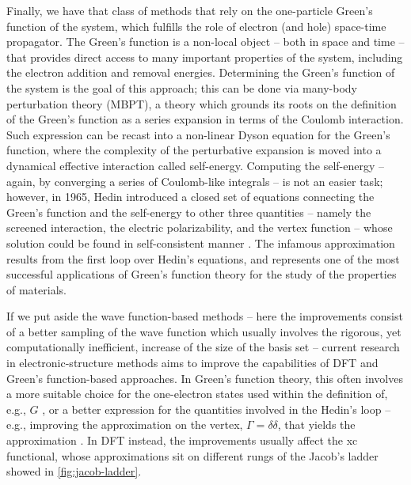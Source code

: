 Finally, we have that class of methods that rely on the one-particle Green's function of the system, which fulfills the role of electron (and hole) space-time propagator. The Green's function is a non-local object -- both in space and time -- that provides direct access to many important properties of the system, including the electron addition and removal energies. Determining the Green's function of the system is the goal of this approach; this can be done via many-body perturbation theory (MBPT), a theory which grounds its roots on the definition of the Green's function as a series expansion in terms of the Coulomb interaction. Such expression can be recast into a non-linear Dyson equation for the Green's function, where the complexity of the perturbative expansion is moved into a dynamical effective interaction called self-energy. Computing the self-energy -- again, by converging a series of Coulomb-like integrals -- is not an easier task; however, in 1965, Hedin introduced a closed set of equations connecting the Green's function and the self-energy to other three quantities -- namely the screened interaction, the electric polarizability, and the vertex function -- whose solution could be found in self-consistent manner \cite{hedin_new_1965}. The infamous \gw approximation results from the first loop over Hedin's equations, and represents one of the most successful applications of Green's function theory for the study of the properties of materials.

If we put aside the wave function-based methods -- here the improvements consist of a better sampling of the wave function which usually involves the rigorous, yet computationally inefficient, increase of the size of the basis set -- current research in electronic-structure methods aims to improve the capabilities of DFT and Green's function-based approaches. In Green's function theory, this often involves a more suitable choice for the one-electron states used within the definition of, e.g., $G$ \cite{bruneval_benchmarking_2013}, or a better expression for the quantities involved in the Hedin's loop -- e.g., improving the approximation on the vertex, $\Gamma=\delta \delta$, that yields the \gw approximation \cite{chen_accurate_2015}. In DFT instead, the improvements usually affect the xc functional, whose approximations sit on different rungs of the Jacob's ladder showed in \cref{fig:jacob-ladder}.


